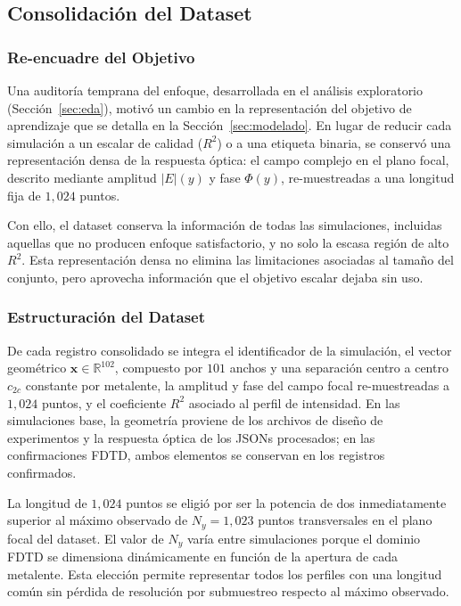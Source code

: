 \subsection{Consolidación del Dataset}\label{subsec:consolidacion}

\subsubsection{Re-encuadre del Objetivo}\label{subsubsec:reencuadre}

Una auditoría temprana del enfoque, desarrollada en el análisis exploratorio (Sección~\ref{sec:eda}), motivó un cambio en la representación del objetivo de aprendizaje que se detalla en la Sección~\ref{sec:modelado}. En lugar de reducir cada simulación a un escalar de calidad ($R^2$) o a una etiqueta binaria, se conservó una representación densa de la respuesta óptica: el campo complejo en el plano focal, descrito mediante amplitud $|E|(y)$ y fase $\Phi(y)$, re-muestreadas a una longitud fija de $1{,}024$ puntos.

Con ello, el dataset conserva la información de todas las simulaciones, incluidas aquellas que no producen enfoque satisfactorio, y no solo la escasa región de alto $R^2$. Esta representación densa no elimina las limitaciones asociadas al tamaño del conjunto, pero aprovecha información que el objetivo escalar dejaba sin uso.

\subsubsection{Estructuración del Dataset}

De cada registro consolidado se integra el identificador de la simulación, el vector geométrico $\mathbf{x} \in \mathbb{R}^{102}$, compuesto por $101$ anchos y una separación centro a centro $c_{2c}$ constante por metalente, la amplitud y fase del campo focal re-muestreadas a $1{,}024$ puntos, y el coeficiente $R^2$ asociado al perfil de intensidad. En las simulaciones base, la geometría proviene de los archivos de diseño de experimentos y la respuesta óptica de los JSONs procesados; en las confirmaciones FDTD, ambos elementos se conservan en los registros confirmados.

La longitud de $1{,}024$ puntos se eligió por ser la potencia de dos inmediatamente superior al máximo observado de $N_y = 1{,}023$ puntos transversales en el plano focal del dataset. El valor de $N_y$ varía entre simulaciones porque el dominio FDTD se dimensiona dinámicamente en función de la apertura de cada metalente. Esta elección permite representar todos los perfiles con una longitud común sin pérdida de resolución por submuestreo respecto al máximo observado.

